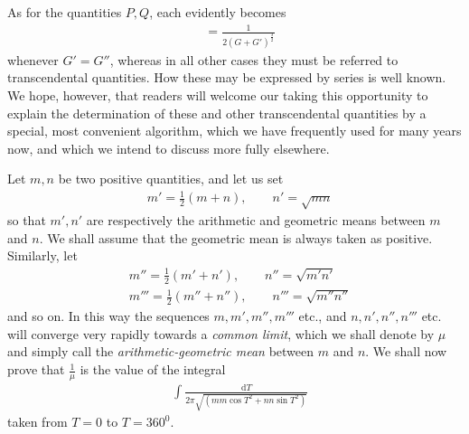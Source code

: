 \begingroup
\renewcommand{\arraystretch}{1.45}

As for the quantities $P,Q$, each evidently becomes
\[
\begin{aligned}
&=\frac{1}{2(G+G')^{\frac32}}
\end{aligned}
\]
whenever $G'=G''$, whereas in all other cases they must be referred to transcendental quantities. How these may be expressed by series is well known. We hope, however, that readers will welcome our taking this opportunity to explain the determination of these and other transcendental quantities by a special, most convenient algorithm, which we have frequently used for many years now, and which we intend to discuss more fully elsewhere.

Let $m,n$ be two positive quantities, and let us set
\[
\begin{aligned}
&m'=\frac12(m+n),\qquad n'=\surd{mn}
\end{aligned}
\]
so that $m',n'$ are respectively the arithmetic and geometric means between $m$ and $n$. We shall assume that the geometric mean is always taken as positive. Similarly, let
\[
\begin{aligned}
&m''=\frac12(m'+n'),\qquad n''=\surd{m'n'}\\[8pt]
&m'''=\frac12(m''+n''),\qquad n'''=\surd{m''n''}
\end{aligned}
\]
and so on. In this way the sequences $m,m',m'',m'''$ etc., and $n,n',n'',n'''$ etc. will converge very rapidly towards a \emph{common limit}, which we shall denote by $\mu$ and simply call the \emph{arithmetic-geometric mean} between $m$ and $n$. We shall now prove that $\frac1\mu$ is the value of the integral
\[
\begin{aligned}
&\int\frac{\mathrm dT}{2\pi\surd{(mm\cos T^2+nn\sin T^2)}}
\end{aligned}
\]
taken from $T=0$ to $T=360^0$.

